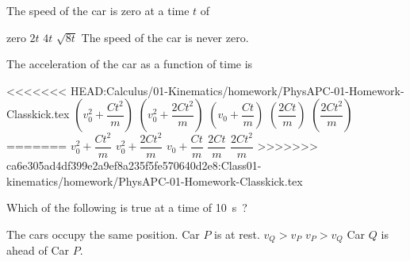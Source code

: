 \documentclass{../../oss-classkick-exam}
\begin{document}
\begin{multicols*}{2}
\begin{questions}
    \question The speed of the car is zero at a time $t$ of
    \begin{choices}
      \choice zero
      \choice $2t$
      \choice $4t$
      \choice $\sqrt{8t}$
      \choice The speed of the car is never zero.
    \end{choices}
    \vspace{.65in}
    \label{car1}
    
    \question The acceleration of the car as a function of time is
    \begin{choices}
<<<<<<< HEAD:Calculus/01-Kinematics/homework/PhysAPC-01-Homework-Classkick.tex
      \choice $\left(v_0^2+\dfrac{Ct^2}{m}\right)$
      \choice $\left(v_0^2+\dfrac{2Ct^2}{m}\right)$
      \choice $\left(v_0+\dfrac{Ct}{m}\right)$
      \choice $\left(\dfrac{2Ct}{m}\right)$
      \choice $\left(\dfrac{2Ct^2}{m}\right)$
=======
      \choice $v_0^2+\dfrac{Ct^2}m$
      \choice $v_0^2+\dfrac{2Ct^2}m$
      \choice $v_0+\dfrac{Ct}m$
      \choice $\dfrac{2Ct}m$
      \choice $\dfrac{2Ct^2}m$
>>>>>>> ca6e305ad4df399e2a9ef8a235f5fe570640d2e8:Class01-kinematics/homework/PhysAPC-01-Homework-Classkick.tex
    \end{choices}
    \label{car2}
  
    
    \question Which of the following is true at a time of \SI{10}\second?
    \begin{choices}
      \choice The cars occupy the same position.
      \choice Car $P$ is at rest.
      \choice $v_Q>v_P$
      \choice $v_P>v_Q$
      \choice Car $Q$ is ahead of Car $P$.
    \end{choices}
    \label{q:graph1}
    \vspace{.65in}
    

\end{questions}
\end{multicols*}
\end{document}
